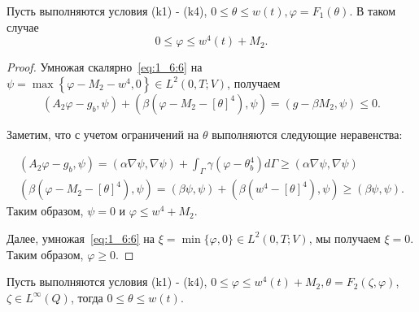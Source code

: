 \begin{lemma}
    \label{lm:1_6:1}
    Пусть выполняются условия (k1) - (k4), $0 \leq \theta \leq w(t), \varphi=F_{1}(\theta)$.
    В таком случае
    \begin{equation}
        \label{eq:1_6:8}
        0 \leq \varphi \leq w^{4}(t)+M_2.
    \end{equation}
\end{lemma}

\begin{proof}
    Умножая скалярно~\eqref{eq:1_6:6} на
    $\psi=\max \left\{\varphi-M_{2}-w^{4}, 0\right\} \in L^{2}(0, T ; V)$,
    получаем
    \[
        \left(A_{2} \varphi-g_{b}, \psi\right)+\left(\beta\left(\varphi-M_{2}
        -[\theta]^{4}\right), \psi\right)=\left(g-\beta M_{2}, \psi\right) \leq 0.
    \]

    Заметим, что с учетом ограничений на $\theta$ выполняются следующие неравенства:

    \[
        \begin{gathered}
            \left(A_{2} \varphi-g_{b}, \psi\right)=(\alpha \nabla \psi, \nabla \psi)+\int_{\Gamma}
            \gamma\left(\varphi-\theta_{b}^{4}\right) d \Gamma \geq(\alpha \nabla \psi, \nabla \psi) \\
            \left(\beta\left(\varphi-M_{2}-[\theta]^{4}\right),
            \psi\right)=(\beta \psi, \psi)+\left(\beta\left(w^{4}
            -[\theta]^{4}\right), \psi\right) \geq(\beta \psi, \psi).
        \end{gathered}
    \]
    Таким образом, $\psi=0$ и $\varphi \leq w^{4}+M_{2}$.

    Далее, умножая~\eqref{eq:1_6:6} на $\xi=\min \{\varphi, 0\} \in L^{2}(0, T ; V)$,
    мы получаем $\xi=0$.
    Таким образом, $\varphi \geq 0$.
\end{proof}

\begin{lemma}
    \label{lm:1_6:2}
    Пусть выполняются условия (k1) - (k4),
    $0 \leq \varphi \leq w^{4}(t)+M_{2}, \theta=F_{2}(\zeta, \varphi)$,
    $\zeta \in L^{\infty}(Q)$, тогда $0 \leq \theta \leq w(t)$.
\end{lemma}

